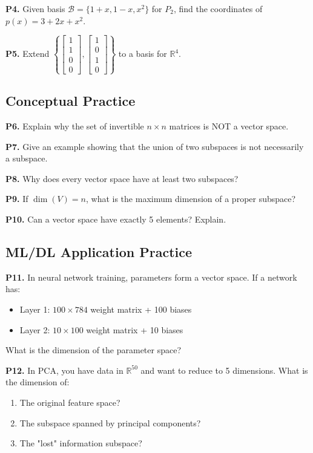 \documentclass[12pt,a4paper]{article}
\theoremstyle{definition}
\begin{document}
\textbf{P4.} Given basis $\mathcal{B} = \{1 + x, 1 - x, x^2\}$ for $P_2$, find the coordinates of $p(x) = 3 + 2x + x^2$.

\textbf{P5.} Extend $\left\{\begin{bmatrix} 1 \\ 1 \\ 0 \\ 0 \end{bmatrix}, \begin{bmatrix} 1 \\ 0 \\ 1 \\ 0 \end{bmatrix}\right\}$ to a basis for $\mathbb{R}^4$.

\subsection{Conceptual Practice}

\textbf{P6.} Explain why the set of invertible $n \times n$ matrices is NOT a vector space.

\textbf{P7.} Give an example showing that the union of two subspaces is not necessarily a subspace.

\textbf{P8.} Why does every vector space have at least two subspaces?

\textbf{P9.} If $\dim(V) = n$, what is the maximum dimension of a proper subspace?

\textbf{P10.} Can a vector space have exactly 5 elements? Explain.

\subsection{ML/DL Application Practice}

\textbf{P11.} In neural network training, parameters form a vector space. If a network has:
\begin{itemize}
    \item Layer 1: $100 \times 784$ weight matrix + 100 biases
    \item Layer 2: $10 \times 100$ weight matrix + 10 biases
\end{itemize}
What is the dimension of the parameter space?

\textbf{P12.} In PCA, you have data in $\mathbb{R}^{50}$ and want to reduce to 5 dimensions. What is the dimension of:
\begin{enumerate}[label=(\alph*)]
    \item The original feature space?
    \item The subspace spanned by principal components?
    \item The "lost" information subspace?
\end{enumerate}
\end{document}
